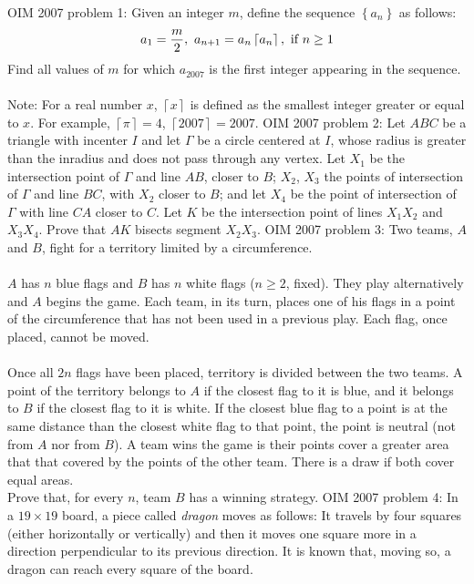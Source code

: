 OIM 2007 problem 1:  Given an integer $ m$, define the sequence $ \left\{a_n\right\}$ as follows:
\[ a_1=\frac{m}{2},\ a_{n+1}=a_n\left\lceil a_n\right\rceil,\textnormal{ if }n\geq 1 \]
Find all values of $ m$ for which $ a_{2007}$ is the first integer appearing in the sequence. \\\\
Note: For a real number $ x$, $ \left\lceil x\right\rceil$ is defined as the smallest integer greater or equal to $ x$. For example, $ \left\lceil\pi\right\rceil=4$, $ \left\lceil 2007\right\rceil=2007$. 
OIM 2007 problem 2:  Let $ ABC$ be a triangle with incenter $ I$ and let $ \Gamma$ be a circle centered at $ I$, whose radius is greater than the inradius and does not pass through any vertex. Let $ X_1$ be the intersection point of $ \Gamma$ and line $ AB$, closer to $ B$; $ X_2$, $ X_3$ the points of intersection of $ \Gamma$ and line $ BC$, with $ X_2$ closer to $ B$; and let $ X_4$ be the point of intersection of $ \Gamma$ with line $ CA$ closer to $ C$. Let $ K$ be the intersection point of lines $ X_1X_2$ and $ X_3X_4$. Prove that $ AK$ bisects segment $ X_2X_3$. 
OIM 2007 problem 3:  Two teams, $ A$ and $ B$, fight for a territory limited by a circumference. \\\\
$ A$ has $ n$ blue flags and $ B$ has $ n$ white flags ($ n\geq 2$, fixed). They play alternatively and $ A$ begins the game. Each team, in its turn, places one of his flags in a point of the circumference that has not been used in a previous play. Each flag, once placed, cannot be moved. \\\\
Once all $ 2n$ flags have been placed, territory is divided between the two teams. A point of the territory belongs to $ A$ if the closest flag to it is blue, and it belongs to $ B$ if the closest flag to it is white. If the closest blue flag to a point is at the same distance than the closest white flag to that point, the point is neutral (not from $ A$ nor from $ B$). A team wins the game is their points cover a greater area that that covered by the points of the other team. There is a draw if both cover equal areas. \\
Prove that, for every $ n$, team $ B$ has a winning strategy. 
OIM 2007 problem 4:  In a $ 19\times 19$ board, a piece called \textit{dragon} moves as follows: It travels by four squares (either horizontally or vertically) and then it moves one square more in a direction perpendicular to its previous direction. It is known that, moving so, a dragon can reach every square of the board. \\\\
